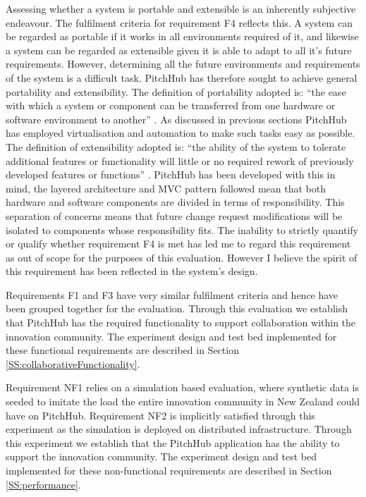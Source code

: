 Assessing whether a system is portable and extensible is an inherently subjective endeavour. The fulfilment criteria for requirement F4 reflects this. A system can be regarded as portable if it works in all environments required of it, and likewise a system can be regarded as extensible given it is able to adapt to all it's future requirements. However, determining all the future environments and requirements of the system is a difficult task. PitchHub has therefore sought to achieve general portability and extensibility. The definition of portability adopted is: ``the ease with which a system or component can be transferred from one hardware or software environment to another'' \cite{mattsson2006software}. As discussed in previous sections PitchHub has employed virtualisation and automation to make such tasks easy as possible. The definition of extensibility adopted is: ``the ability of the system to tolerate additional features or functionality will little or no required rework of previously developed features or functions'' \cite{Extensibility:online}. PitchHub has been developed with this in mind, the layered architecture and MVC pattern followed mean that both hardware and software components are divided in terms of responsibility. This separation of concerns means that future change request modifications will be isolated to components whose responsibility fits. The inability to strictly quantify or qualify whether requirement F4 is met has led me to regard this requirement as out of scope for the purposes of this evaluation. However I believe the spirit of this requirement has been reflected in the system's design.

Requirements F1 and F3 have very similar fulfilment criteria and hence have been grouped together for the evaluation. Through this evaluation we establish that PitchHub has the required functionality to support collaboration within the innovation community. The experiment design and test bed implemented for these functional requirements are described in Section \ref{SS:collaborativeFunctionality}.

Requirement NF1 relies on a simulation based evaluation, where synthetic data is seeded to imitate the load the entire innovation community in New Zealand could have on PitchHub. Requirement NF2 is implicitly satisfied through this experiment as the simulation is deployed on distributed infrastructure. Through this experiment we establish that the PitchHub application has the ability to support the innovation community. The experiment design and test bed implemented for these non-functional requirements are described in Section \ref{SS:performance}.

